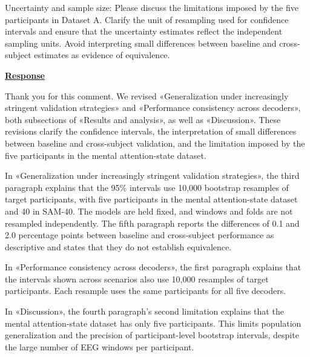 \documentclass{article}
\begin{document}
\vspace{0.3cm}


\begin{cmt}{}{}

Uncertainty and sample size: Please discuss the limitations imposed by the five
participants in Dataset A. Clarify the unit of resampling used for confidence
intervals and ensure that the uncertainty estimates reflect the independent
sampling units. Avoid interpreting small differences between baseline and
cross-subject estimates as evidence of equivalence.

\end{cmt}
\vspace{0.1cm}
\noindent
\underline{\textbf{Response}}
\vspace{0.2cm}

Thank you for this comment. We revised «Generalization under increasingly
stringent validation strategies» and «Performance consistency across
decoders», both subsections of «Results and analysis», as well as «Discussion».
These revisions clarify the confidence intervals, the interpretation of small
differences between baseline and cross-subject validation, and the limitation
imposed by the five participants in the mental attention-state dataset.

In «Generalization under increasingly stringent validation strategies», the
third paragraph explains that the 95\% intervals use 10,000 bootstrap resamples
of target participants, with five participants in the mental attention-state
dataset and 40 in SAM-40. The models are held fixed, and windows and folds are
not resampled independently. The fifth paragraph reports the differences of
0.1 and 2.0 percentage points between baseline and cross-subject performance as
descriptive and states that they do not establish equivalence.

In «Performance consistency across decoders», the first paragraph explains
that the intervals shown across scenarios also use 10,000 resamples of target
participants. Each resample uses the same participants for all five decoders.

In «Discussion», the fourth paragraph's second limitation explains that the
mental attention-state dataset has only five participants. This limits
population generalization and the precision of participant-level bootstrap
intervals, despite the large number of EEG windows per participant.

\vspace{0.3cm}
\end{document}
